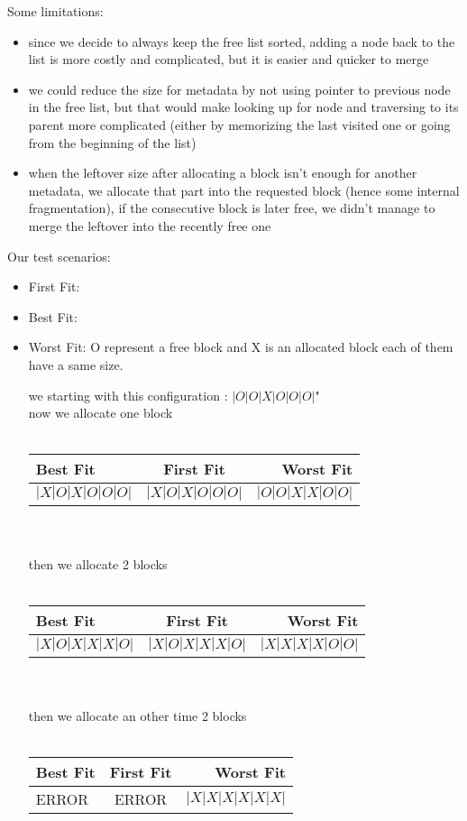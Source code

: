 \documentclass{article}
\begin{document}
\begin{flushleft}
Some limitations:
\end{flushleft}

\begin{itemize}
\item since we decide to always keep the free list sorted, adding a node back to the list is more costly and complicated, but it is easier and quicker to merge
\item we could reduce the size for metadata by not using pointer to previous node in the free list, but that would make looking up for node and traversing to its parent more complicated (either by memorizing the last visited one or going from the beginning of the list)
\item when the leftover size after allocating a block isn't enough for another metadata, we allocate that part into the requested block (hence some internal fragmentation), if the consecutive block is later free, we didn't manage to merge the leftover into the recently free one
\end{itemize}

\begin{flushleft}
Our test scenarios:
\end{flushleft}

\begin{itemize}
\item First Fit:
\item Best Fit:
\item Worst Fit:
O represent a free block and X is an allocated block each of them have a same size.

we starting with this configuration :
$|O|O|X|O|O|O|$"\\
now we allocate one block\\\\
\begin{tabular}{|l|c|r|}
   \hline 
   Best Fit & First Fit & Worst Fit \\
   \hline
   $|X|O|X|O|O|O|$ & $|X|O|X|O|O|O|$ & $|O|O|X|X|O|O|$ \\
   \hline
\end{tabular}
\\
\\then we allocate 2 blocks\\\\
\begin{tabular}{|l|c|r|}
   \hline 
   Best Fit & First Fit & Worst Fit \\
   \hline
   $|X|O|X|X|X|O|$ & $|X|O|X|X|X|O|$ & $|X|X|X|X|O|O|$ \\
   \hline
\end{tabular}
\\
\\then we allocate an other time 2 blocks\\\\
\begin{tabular}{|l|c|r|}
   \hline 
   Best Fit & First Fit & Worst Fit \\
   \hline
   ERROR & ERROR & $|X|X|X|X|X|X|$ \\
   \hline
\end{tabular}


\end{itemize}
\end{document}

